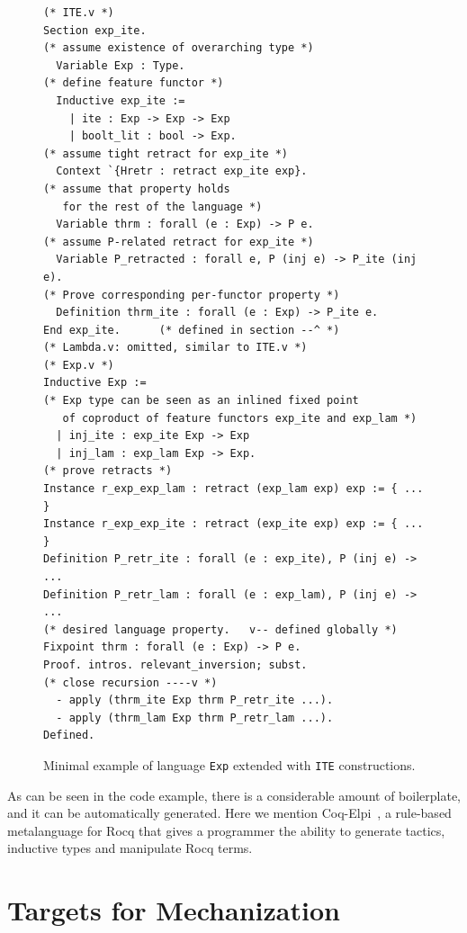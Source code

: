 \documentclass[sigplan,nonacm,review]{acmart}
\begin{document}
\begin{figure}
\begin{lstlisting}[language=Coq]
(* ITE.v *)
Section exp_ite.
(* assume existence of overarching type *)
  Variable Exp : Type.
(* define feature functor *)
  Inductive exp_ite := 
    | ite : Exp -> Exp -> Exp
    | boolt_lit : bool -> Exp.
(* assume tight retract for exp_ite *)
  Context `{Hretr : retract exp_ite exp}.
(* assume that property holds 
   for the rest of the language *)
  Variable thrm : forall (e : Exp) -> P e.
(* assume P-related retract for exp_ite *)
  Variable P_retracted : forall e, P (inj e) -> P_ite (inj e).
(* Prove corresponding per-functor property *)
  Definition thrm_ite : forall (e : Exp) -> P_ite e.
End exp_ite.      (* defined in section --^ *)
(* Lambda.v: omitted, similar to ITE.v *)
(* Exp.v *)
Inductive Exp := 
(* Exp type can be seen as an inlined fixed point 
   of coproduct of feature functors exp_ite and exp_lam *)
  | inj_ite : exp_ite Exp -> Exp
  | inj_lam : exp_lam Exp -> Exp.
(* prove retracts *)
Instance r_exp_exp_lam : retract (exp_lam exp) exp := { ... }
Instance r_exp_exp_ite : retract (exp_ite exp) exp := { ... }
Definition P_retr_ite : forall (e : exp_ite), P (inj e) -> ...
Definition P_retr_lam : forall (e : exp_lam), P (inj e) -> ...
(* desired language property.   v-- defined globally *)
Fixpoint thrm : forall (e : Exp) -> P e.
Proof. intros. relevant_inversion; subst.
(* close recursion ----v *)
  - apply (thrm_ite Exp thrm P_retr_ite ...).
  - apply (thrm_lam Exp thrm P_retr_lam ...).
Defined.
\end{lstlisting}
  \caption{Minimal example of language \texttt{Exp} extended with \texttt{ITE} constructions. 
  }
  \label{fig:alacart_example}
\end{figure}



As can be seen in the code example,
there is a considerable amount of boilerplate,
and it can be automatically generated.
Here we mention Coq-Elpi~\cite{tassi2025elpi}, a rule-based metalanguage for Rocq that
gives a programmer the ability to generate tactics,
inductive types and manipulate Rocq terms.



\section{Targets for Mechanization}
\end{document}
